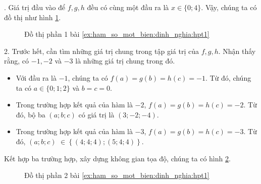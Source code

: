 
\setcounter{subexercise}{1}
. Giá trị đầu vào để $f, g, h$ đều có cùng một đầu ra là $x\in\{0;4\}$. Vậy, chúng ta có đồ thị như hình \ref{fig:hpt11}.

\begin{figure}[H]
   \centering
   \caption{Đồ thị phần 1 bài \ref{ex:ham_so_mot_bien:dinh_nghia:hpt1}}
   \label{fig:hpt11}
\end{figure}

2. Trước hết, cần tìm những giá trị chung trong tập giá trị của $f, g, h$. Nhận thấy rằng, có $-1, -2$ và $-3$ là những giá trị chung trong đó. 
\begin{itemize}
   \item Với đầu ra là $-1$, chúng ta có $f(a) = g(b) = h(c) = -1$. Từ đó, chúng ta có $a \in \{0; 1; 2\}$ và $b = c = 0$.
   \item Trong trường hợp kết quả của hàm là $-2$, $f(a) = g(b) = h(c) = -2$. Từ đó, bộ ba $\left(a; b; c\right)$ có giá trị là $(3; -2; -4)$.
   \item Trong trường hợp kết quả của hàm là $-3$, $f(a) = g(b) = h(c) = -3$. Từ đó, $\left(a; b; c\right)$ $\in \left\{\left(4; 4; 4\right); \left(5; 4; 4\right)\right\}$.
\end{itemize}
Kết hợp ba trường hợp, xây dựng không gian tọa độ, chúng ta có hình \ref{fig:hpt12}.

\begin{figure}[H]
   \centering
   \caption{Đồ thị phần 2 bài \ref{ex:ham_so_mot_bien:dinh_nghia:hpt1}}
   \label{fig:hpt12}
\end{figure}

